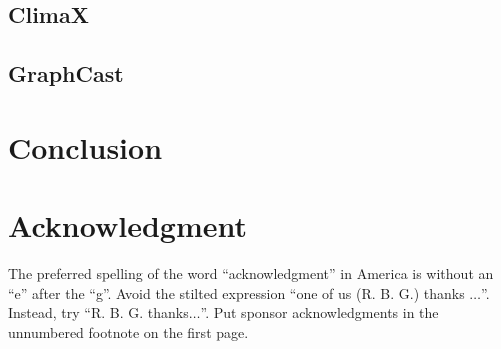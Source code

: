 \documentclass[conference]{IEEEtran}
\begin{document}
\subsection{ClimaX}\label{subsec:climax}


\subsection{GraphCast}\label{subsec:graphcast}


\section{Conclusion}\label{sec:conclusion}


\section*{Acknowledgment}
The preferred spelling of the word ``acknowledgment'' in America is without
an ``e'' after the ``g''. Avoid the stilted expression ``one of us (R. B.
G.) thanks $\ldots$''. Instead, try ``R. B. G. thanks$\ldots$''. Put sponsor
acknowledgments in the unnumbered footnote on the first page.


\end{document}

